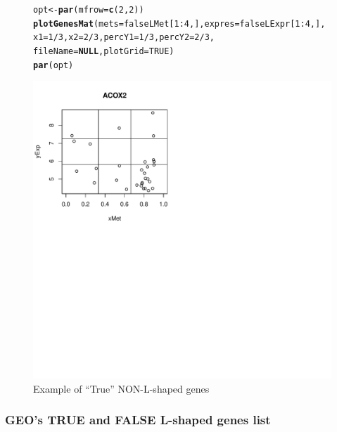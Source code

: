 \documentclass[a4paper,10pt]{article}\usepackage[]{graphicx}\usepackage[]{xcolor}
\makeatletter
\def\maxwidth{ %
  \ifdim\Gin@nat@width>\linewidth
    \linewidth
  \else
    \Gin@nat@width
  \fi
}
\newcommand{\hlnum}[1]{\textcolor[rgb]{0.686,0.059,0.569}{#1}}%
\newcommand{\hlopt}[1]{\textcolor[rgb]{0,0,0}{#1}}%
\newcommand{\hlstd}[1]{\textcolor[rgb]{0.345,0.345,0.345}{#1}}%
\newcommand{\hlkwa}[1]{\textcolor[rgb]{0.161,0.373,0.58}{\textbf{#1}}}%
\newcommand{\hlkwb}[1]{\textcolor[rgb]{0.69,0.353,0.396}{#1}}%
\newcommand{\hlkwc}[1]{\textcolor[rgb]{0.333,0.667,0.333}{#1}}%
\newcommand{\hlkwd}[1]{\textcolor[rgb]{0.737,0.353,0.396}{\textbf{#1}}}%
\newenvironment{kframe}{%
 \def\at@end@of@kframe{}%
 \ifinner\ifhmode%
  \def\at@end@of@kframe{\end{minipage}}%
  \begin{minipage}{\columnwidth}%
 \fi\fi%
 \def\FrameCommand##1{\hskip\@totalleftmargin \hskip-\fboxsep
 \colorbox{shadecolor}{##1}\hskip-\fboxsep
     \hskip-\linewidth \hskip-\@totalleftmargin \hskip\columnwidth}%
 \MakeFramed {\advance\hsize-\width
   \@totalleftmargin\z@ \linewidth\hsize
   \@setminipage}}%
 {\par\unskip\endMakeFramed%
 \at@end@of@kframe}
\newenvironment{knitrout}{}{} %
\makeatother
\begin{document}
\begin{figure}
\centering
\begin{knitrout}
\color{fgcolor}\begin{kframe}
\begin{alltt}
\hlstd{opt}\hlkwb{<-} \hlkwd{par}\hlstd{(}\hlkwc{mfrow}\hlstd{=}\hlkwd{c}\hlstd{(}\hlnum{2}\hlstd{,}\hlnum{2}\hlstd{))}
\hlkwd{plotGenesMat} \hlstd{(}\hlkwc{mets}\hlstd{=falseLMet[}\hlnum{1}\hlopt{:}\hlnum{4}\hlstd{,],} \hlkwc{expres}\hlstd{=falseLExpr[}\hlnum{1}\hlopt{:}\hlnum{4}\hlstd{,],}
              \hlkwc{x1}\hlstd{=}\hlnum{1}\hlopt{/}\hlnum{3}\hlstd{,} \hlkwc{x2}\hlstd{=}\hlnum{2}\hlopt{/}\hlnum{3}\hlstd{,} \hlkwc{percY1}\hlstd{=}\hlnum{1}\hlopt{/}\hlnum{3}\hlstd{,} \hlkwc{percY2}\hlstd{=}\hlnum{2}\hlopt{/}\hlnum{3}\hlstd{,}
               \hlkwc{fileName}\hlstd{=}\hlkwa{NULL}\hlstd{,} \hlkwc{plotGrid} \hlstd{=} \hlnum{TRUE}\hlstd{)}
\hlkwd{par}\hlstd{(opt)}
\end{alltt}
\end{kframe}
\includegraphics[width=\maxwidth]{figure/plotFALSE1-1} 
\end{knitrout}
\caption{Example of ``True'' NON-L-shaped genes\label{Lshaped2}}
\end{figure}

\subsubsection{GEO's TRUE and FALSE L-shaped genes list}
\end{document}

